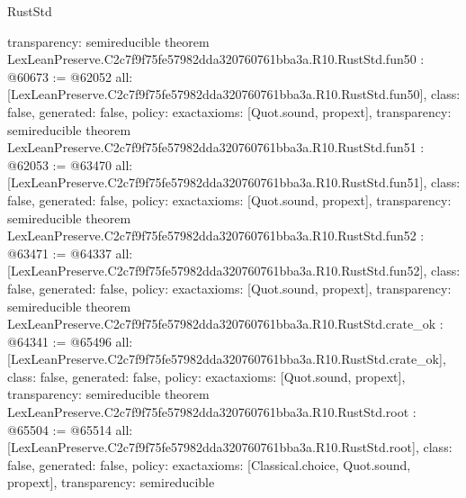 \begin{lexlean}{RustStd}
\begin{coremodule}
{  transparency: semireducible
}
theorem LexLeanPreserve.C2c7f9f75fe57982dda320760761bba3a.R10.RustStd.fun50 : @60673 := @62052 {
  all: [LexLeanPreserve.C2c7f9f75fe57982dda320760761bba3a.R10.RustStd.fun50],
  class: false,
  generated: false,
  policy: exact{axioms: [Quot.sound, propext]},
  transparency: semireducible
}
theorem LexLeanPreserve.C2c7f9f75fe57982dda320760761bba3a.R10.RustStd.fun51 : @62053 := @63470 {
  all: [LexLeanPreserve.C2c7f9f75fe57982dda320760761bba3a.R10.RustStd.fun51],
  class: false,
  generated: false,
  policy: exact{axioms: [Quot.sound, propext]},
  transparency: semireducible
}
theorem LexLeanPreserve.C2c7f9f75fe57982dda320760761bba3a.R10.RustStd.fun52 : @63471 := @64337 {
  all: [LexLeanPreserve.C2c7f9f75fe57982dda320760761bba3a.R10.RustStd.fun52],
  class: false,
  generated: false,
  policy: exact{axioms: [Quot.sound, propext]},
  transparency: semireducible
}
theorem LexLeanPreserve.C2c7f9f75fe57982dda320760761bba3a.R10.RustStd.crate_ok : @64341 := @65496 {
  all: [LexLeanPreserve.C2c7f9f75fe57982dda320760761bba3a.R10.RustStd.crate_ok],
  class: false,
  generated: false,
  policy: exact{axioms: [Quot.sound, propext]},
  transparency: semireducible
}
theorem LexLeanPreserve.C2c7f9f75fe57982dda320760761bba3a.R10.RustStd.root : @65504 := @65514 {
  all: [LexLeanPreserve.C2c7f9f75fe57982dda320760761bba3a.R10.RustStd.root],
  class: false,
  generated: false,
  policy: exact{axioms: [Classical.choice, Quot.sound, propext]},
  transparency: semireducible
}


\end{coremodule}
\end{lexlean}
